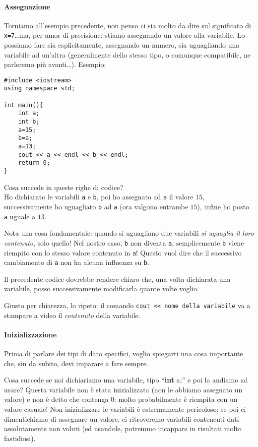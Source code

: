 	\paragraph{Assegnazione}Torniamo all'esempio precedente, non penso ci sia molto da dire sul significato di \verb|x=7|\ldots ma, per amor di precisione: stiamo assegnando un valore alla variabile. Lo possiamo fare sia esplicitamente, assegnando un numero, sia uguagliando una variabile ad un'altra (generalmente dello stesso tipo, o comunque compatibile, ne parleremo più avanti\ldots). Esempio:
	\begin{lstlisting}
#include <iostream>
using namespace std;

int main(){
	int a;
	int b;
	a=15;
	b=a;
	a=13;
	cout << a << endl << b << endl;
	return 0;
}
	\end{lstlisting}
	Cosa succede in queste righe di codice? \\
	Ho dichiarato le variabili \verb|a| e \verb|b|, poi ho assegnato ad \verb|a| il valore $15$, successivamente   ho uguagliato \verb|b| ad  \verb|a| (ora valgono entrambe $15$), infine ho posto \verb|a| uguale a $13$.
	
	Nota una cosa fondamentale: quando si uguagliano due variabili \emph{si uguaglia il loro contenuto}, solo quello! Nel nostro caso,  \verb|b| non diventa  \verb|a|, semplicemente  \verb|b| viene riempito con lo stesso valore contenuto in  \verb|a|! Questo vuol dire che il successivo cambiamento di  \verb|a| non ha alcuna influenza su \verb|b|.
	
	Il precedente codice dovrebbe rendere chiaro che, una volta dichiarata una variabile, posso successivamente modificarla quante volte voglio.
	
	Giusto per chiarezza, lo ripeto: il comando \verb|cout << nome della variabile| va a stampare a video il \emph{ contenuto} della variabile. 
	
	\paragraph{Inizializzazione}
	Prima di parlare dei tipi di dato specifici, voglio spiegarti una cosa importante che, sin da subito, devi imparare a fare sempre. 
	
	Cosa succede se noi dichiariamo una variabile, tipo ``\textbf{int} a;'' e poi la andiamo ad usare? Questa variabile non è stata inizializzata (non le abbiamo assegnato un valore) e non è detto che contenga 0: molto probabilmente è riempita con un valore casuale! Non inizializzare le variabili è estremamente pericoloso: se poi ci dimentichiamo di assegnare un valore, ci ritroveremo variabili contenenti dati assolutamente non voluti (ed usandole, potremmo incappare in risultati molto fastidiosi). 
	
